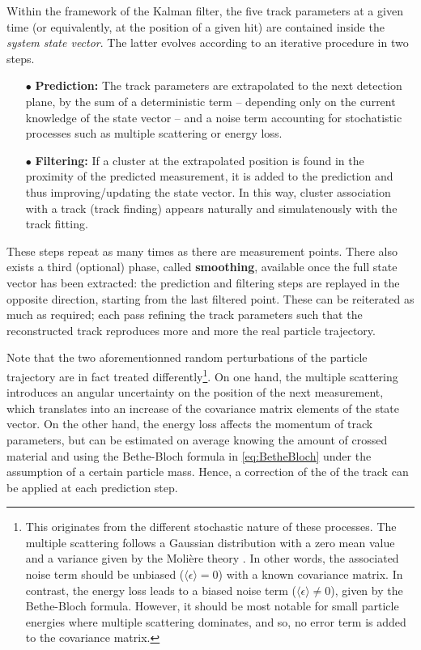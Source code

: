 Within the framework of the Kalman filter, the five track parameters at a given time (or equivalently, at the position of a given hit) are contained inside the \textit{system state vector}. The latter evolves according to an iterative procedure in two steps. 
\begin{itemize}
\item[$\bullet$] \textbf{Prediction:} The track parameters are extrapolated to the next detection plane, by the sum of a deterministic term -- depending only on the current knowledge of the state vector -- and a noise term accounting for stochatistic processes such as multiple scattering or energy loss.
\item[$\bullet$] \textbf{Filtering:} If a cluster at the extrapolated position is found in the proximity of the predicted measurement, it is added to the prediction and thus improving/updating the state vector. In this way, cluster association with a track (track finding) appears naturally and simulatenously with the track fitting.
\end{itemize}
These steps repeat as many times as there are measurement points. There also exists a third (optional) phase, called \textbf{smoothing}, available once the full state vector has been extracted: the prediction and filtering steps are replayed in the opposite direction, starting from the last filtered point. These can be reiterated as much as required; each pass refining the track parameters such that the reconstructed track reproduces more and more the real particle trajectory.

Note that the two aforementionned random perturbations of the particle trajectory are in fact treated differently\footnote{This originates from the different stochastic nature of these processes. The multiple scattering follows a Gaussian distribution with a zero mean value and a variance given by the Molière theory \cite{particledatagroupReviewParticlePhysics2022}. In other words, the associated noise term should be unbiased ($\langle \epsilon \rangle = 0 $) with a known covariance matrix. In contrast, the energy loss leads to a biased noise term ($\langle \epsilon \rangle \neq 0 $), given by the Bethe-Bloch formula. However, it should be most notable for small particle energies where multiple scattering dominates, and so, no error term is added to the covariance matrix.}. On one hand, the multiple scattering introduces an angular uncertainty on the position of the next measurement, which translates into an increase of the covariance matrix elements of the state vector. On the other hand, the energy loss affects the momentum of track parameters, but can be estimated on average knowing the amount of crossed material and using the Bethe-Bloch formula in \eq\ref{eq:BetheBloch} under the assumption of a certain particle mass. Hence, a correction of the \dEdx of the track can be applied at each prediction step. \\

